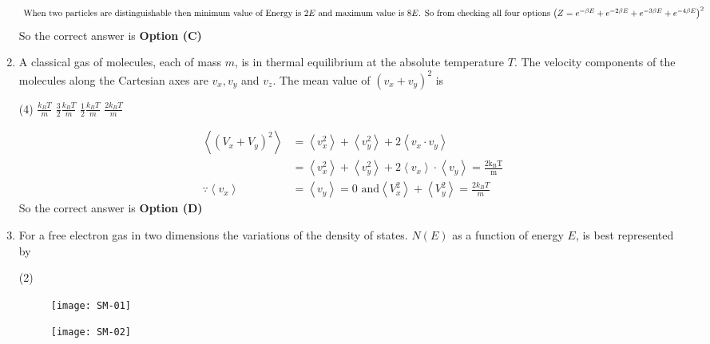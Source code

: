 \begin{enumerate}
\begin{answer}
\begin{align*}
\intertext{ When two particles are distinguishable then minimum value of Energy is $2 E$ and maximum value is $8 E$.
	So from checking all four options $\left(Z=e^{-\beta E}+e^{-2 \beta E}+e^{-3 \beta E}+e^{-4 \beta E}\right)^{2}$}
\end{align*}
So the correct answer is \textbf{Option (C)}
\end{answer}
	\item  A classical gas of molecules, each of mass $m$, is in thermal equilibrium at the absolute temperature $T .$ The velocity components of the molecules along the Cartesian axes are $v_{x}, v_{y}$ and $v_{z} .$ The mean value of $\left(v_{x}+v_{y}\right)^{2}$ is
	{}
\begin{tasks}(4)
\task[\textbf{A.}] $\frac{k_{B} T}{m}$
\task[\textbf{B.}] $\frac{3}{2} \frac{k_{B} T}{m}$
\task[\textbf{C.}] $\frac{1}{2} \frac{k_{B} T}{m}$
\task[\textbf{D.}] $\frac{2 k_{B} T}{m}$
\end{tasks}
\begin{answer}
\begin{align*}
\left\langle\left(V_{x}+V_{y}\right)^{2}\right\rangle&=\left\langle v_{x}^{2}\right\rangle+\left\langle v_{y}^{2}\right\rangle+2\left\langle v_{x} \cdot v_{y}\right\rangle\\&=\left\langle v_{x}^{2}\right\rangle+\left\langle v_{y}^{2}\right\rangle+2\left\langle v_{x}\right\rangle \cdot\left\langle v_{y}\right\rangle=\frac{2 \mathrm{k}_{\mathrm{B}} \mathrm{T}}{\mathrm{m}}\\
\because\left\langle v_{x}\right\rangle&=\left\langle v_{y}\right\rangle=0\text{ and} \left\langle V_{x}^{2}\right\rangle+\left\langle V_{y}^{2}\right\rangle=\frac{2 k_{B} T}{m}
\end{align*}
So the correct answer is \textbf{Option (D)}
\end{answer}
	\item For a free electron gas in two dimensions the variations of the density of states. $N(E)$ as a function of energy $E$, is best represented by
{	}
\begin{tasks}(2)
\task[\textbf{A.}] \begin{figure}[H]
	\centering
	\texttt{[image: SM-01]}
\end{figure}
\task[\textbf{B.}] \begin{figure}[H]
	\centering
	\texttt{[image: SM-02]}
\end{figure}
\task[\textbf{C.}]\begin{figure}[H]

\end{figure}
\end{tasks}
\end{enumerate}
